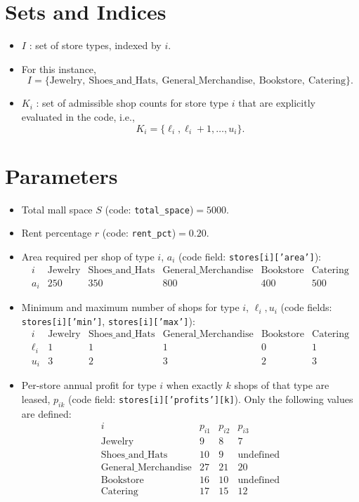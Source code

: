 \section*{Sets and Indices}

\begin{itemize}
    \item $I$ : set of store types, indexed by $i$.
    \item For this instance,
    \[
    I=\{\text{Jewelry},\ \text{Shoes\_and\_Hats},\ \text{General\_Merchandise},\ \text{Bookstore},\ \text{Catering}\}.
    \]
    \item $K_i$ : set of admissible shop counts for store type $i$ that are explicitly evaluated in the code, i.e.,
    \[
    K_i=\{\ell_i,\ell_i+1,\dots,u_i\}.
    \]
\end{itemize}

\section*{Parameters}

\begin{itemize}
    \item Total mall space $S$ (code: \texttt{total\_space})$=5000$.
    \item Rent percentage $r$ (code: \texttt{rent\_pct})$=0.20$.
    \item Area required per shop of type $i$, $a_i$ (code field: \texttt{stores[i]['area']}):
    \[
    \begin{array}{c|ccccc}
    i & \text{Jewelry} & \text{Shoes\_and\_Hats} & \text{General\_Merchandise} & \text{Bookstore} & \text{Catering}\\
    \hline
    a_i & 250 & 350 & 800 & 400 & 500
    \end{array}
    \]
    \item Minimum and maximum number of shops for type $i$, $\ell_i,u_i$ (code fields: \texttt{stores[i]['min']}, \texttt{stores[i]['max']}):
    \[
    \begin{array}{c|ccccc}
    i & \text{Jewelry} & \text{Shoes\_and\_Hats} & \text{General\_Merchandise} & \text{Bookstore} & \text{Catering}\\
    \hline
    \ell_i & 1 & 1 & 1 & 0 & 1\\
    u_i    & 3 & 2 & 3 & 2 & 3
    \end{array}
    \]
    \item Per-store annual profit for type $i$ when exactly $k$ shops of that type are leased, $p_{ik}$ (code field: \texttt{stores[i]['profits'][k]}). Only the following values are defined:
    \[
    \begin{array}{c|ccc}
    i & p_{i1} & p_{i2} & p_{i3}\\
    \hline
    \text{Jewelry} & 9 & 8 & 7\\
    \text{Shoes\_and\_Hats} & 10 & 9 & \text{undefined}\\
    \text{General\_Merchandise} & 27 & 21 & 20\\
    \text{Bookstore} & 16 & 10 & \text{undefined}\\
    \text{Catering} & 17 & 15 & 12
    \end{array}
    \]
\end{itemize}

